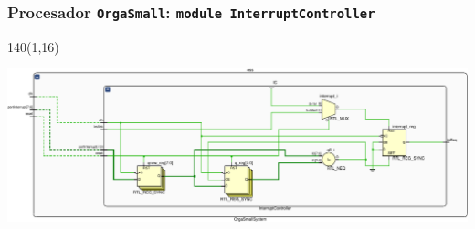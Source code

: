 \documentclass[aspectratio=169]{beamer}
\begin{document}
\begin{frame}[fragile,t]
    \frametitle{Procesador \texttt{OrgaSmall}: \texttt{module InterruptController}}
    \begin{textblock}{140}(1,16)
    \begin{center}
    \includegraphics[scale=0.83]{pdf/schematicIC-crop.pdf}
    \end{center}
    \end{textblock}
\end{frame}
\end{document}
